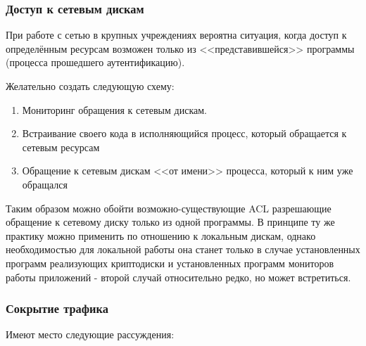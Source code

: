 \subsubsection{Доступ к сетевым дискам}

При работе с сетью в крупных учреждениях вероятна ситуация, когда доступ
к определённым ресурсам возможен только из <<представившейся>> программы
(процесса прошедшего аутентификацию).

Желательно создать следующую схему:

\begin{enumerate}
\item{Мониторинг обращения к сетевым дискам.}
\item{Встраивание своего кода в исполняющийся процесс, который обращается к сетевым ресурсам}
\item{Обращение к сетевым дискам <<от имени>> процесса, который к ним уже обращался}
\end{enumerate}

Таким образом можно обойти возможно-существующие ACL разрешающие
обращение к сетевому диску только из одной программы. В принципе ту же
практику можно применить по отношению к локальным дискам, однако
необходимостью для локальной работы она станет только в случае
установленных программ реализующих криптодиски и установленных программ
мониторов работы приложений - второй случай относительно редко, но может
встретиться.


\subsubsection{Сокрытие трафика}

Имеют место следующие рассуждения:

